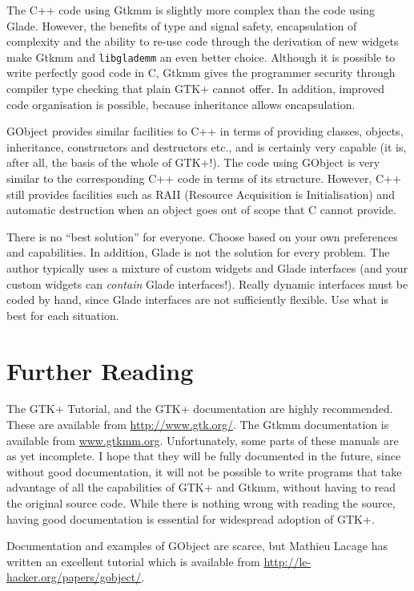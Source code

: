 \documentclass[a4paper,oneside]{article}
\newcommand{\program}[1]{\texttt{#1}}
\begin{document}
The C++ code using Gtkmm is slightly more complex than the code using
Glade.  However, the benefits of type and signal safety, encapsulation
of complexity and the ability to re-use code through the derivation of
new widgets make Gtkmm and \program{libglademm} an even better choice.
Although it is possible to write perfectly good code in C, Gtkmm gives
the programmer security through compiler type checking that plain GTK+
cannot offer.  In addition, improved code organisation is possible,
because inheritance allows encapsulation.

GObject provides similar facilities to C++ in terms of providing
classes, objects, inheritance, constructors and destructors etc., and
is certainly very capable (it is, after all, the basis of the whole of
GTK+!).  The code using GObject is very similar to the corresponding
C++ code in terms of its structure.  However, C++ still provides
facilities such as RAII (Resource Acquisition is Initialisation) and
automatic destruction when an object goes out of scope that C cannot
provide.

There is no ``best solution'' for everyone.  Choose based on your own
preferences and capabilities.  In addition, Glade is not the solution
for every problem.  The author typically uses a mixture of custom
widgets and Glade interfaces (and your custom widgets can
\emph{contain} Glade interfaces!).  Really dynamic interfaces must be
coded by hand, since Glade interfaces are not sufficiently flexible.
Use what is best for each situation.


\section{Further Reading}

The GTK+ Tutorial, and the GTK+ documentation are highly recommended.
These are available from \url{http://www.gtk.org/}.  The Gtkmm
documentation is available from \url{www.gtkmm.org}.  Unfortunately,
some parts of these manuals are as yet incomplete.  I hope that they
will be fully documented in the future, since without good
documentation, it will not be possible to write programs that take
advantage of all the capabilities of GTK+ and Gtkmm, without having to
read the original source code.  While there is nothing wrong with
reading the source, having good documentation is essential for
widespread adoption of GTK+.

Documentation and examples of GObject are scarce, but Mathieu Lacage
has written an excellent tutorial which is available from
\url{http://le-hacker.org/papers/gobject/}.
\end{document}
